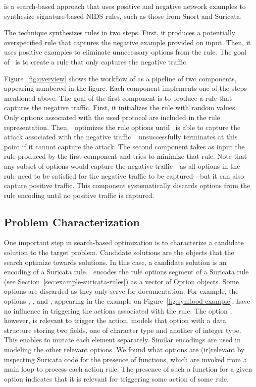 \documentclass[conference]{IEEEtran}
\begin{document}
\tname{} is a search-based approach that uses positive and negative
network examples to synthesize signature-based NIDS rules, such as
those from Snort and Suricata.

The technique synthesizes rules in two steps. First, it produces a
potentially overspecified rule that captures the negative example
provided on input. Then, it uses positive examples to eliminate
unnecessary options from the rule. The goal of \tname\ is to create a
rule that only captures the negative traffic.

Figure~\ref{fig:overview} shows the workflow of \tname{} as a pipeline
of two components, appearing numbered in the figure. Each component
implements one of the steps mentioned above. The goal of the first
component is to produce a rule that captures the negative traffic.
First, it initializes the rule with random values. Only options
associated with the used protocol are included in the rule
representation. Then, \tname\ optimizes the rule options until
\suri\ is able to capture the attack associated with the negative
traffic.  \tname\ unsuccessfully terminates at this point if it cannot
capture the attack. The second component takes as input the rule
produced by the first component and tries to minimize that rule. Note
that any subset of options would capture the negative traffic---as all
options in the rule need to be satisfied for the negative traffic to
be captured---but it can also capture positive traffic. This component
systematically discards options from the rule encoding until no
positive traffic is captured.

\subsection{Problem Characterization}

One important step in search-based optimization is to characterize a
candidate solution to the target problem. Candidate solutions are the
objects that the search optimize towards solutions. In this case, a 
candidate solution is an encoding of a Suricata rule.  \tname\ encodes
the rule options segment of a Suricata rule (see
Section~\ref{sec:example-suricata-rules}) as a vector of Option
objects. Some options are discarded as they only serve for
documentation. For example, the options ,
, and , appearing in the
example on Figure~\ref{fig:synflood-example}, have no influence in
triggering the actions associated with the rule. The option
, however, is relevant to trigger the action. \tname{}
models that option with a data structure storing two fields, one of
character type and another of integer type. This enables \tname{} to
mutate each element separately. Similar encodings are used in modeling
the other relevant options. We found what options are (ir)relevant by
inspecting Suricata code for the presence of  functions,
which are invoked from a main loop to process each action rule. The
presence of such a function for a given option indicates that it is
relevant for triggering some action of some rule.
\end{document}
